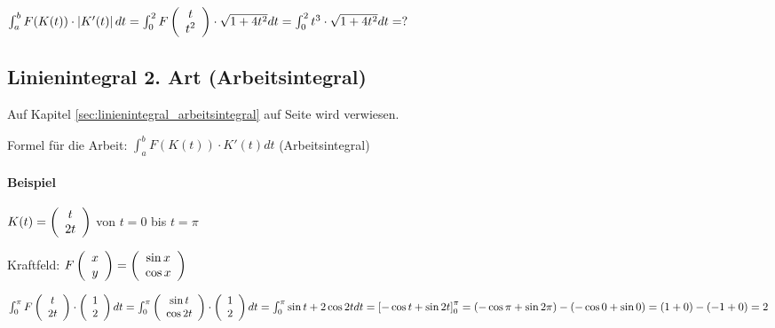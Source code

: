 $ \int_{a}^{b} F(K(t)) \cdot  \left\vert K'(t) \right\vert  dt 
= \int_0^2 F  \left(  \begin{array}{c} t\\t^2 \end{array}  \right)   \cdot \sqrt{1 + 4t^2} dt
= \int_{0}^{2} t^3 \cdot \sqrt{1 + 4t^2} dt
= ?
$

\subsection{Linienintegral 2. Art (Arbeitsintegral)}
Auf Kapitel \ref{sec:linienintegral_arbeitsintegral} auf Seite \pageref{sec:linienintegral_arbeitsintegral} wird verwiesen. 

Formel für die Arbeit: $\int_{a}^{b} F(K(t)) \cdot K'(t) dt$ (Arbeitsintegral) 

\paragraph{Beispiel}
$ K(t) =   \left(  \begin{array}{c} t\\2t \end{array}  \right)  $ von $t=0$ bis $t=\pi$

Kraftfeld: $F  \left(  \begin{array}{c} x\\y \end{array}  \right)   =   \left(  \begin{array}{c} \sin x\\\cos x \end{array}  \right)  $

$ \int_{0}^{\pi} F  \left(  \begin{array}{c} t\\2t \end{array}  \right)   \cdot   \left(  \begin{array}{c} 1\\2 \end{array}  \right)   dt
=\int_{0}^{\pi}   \left(  \begin{array}{c} \sin t\\\cos 2t \end{array}  \right)   \cdot   \left(  \begin{array}{c} 1\\2 \end{array}  \right)   dt
=\int_{0}^{\pi} \sin t + 2\cos 2t dt 
=  \left[ -\cos t + \sin 2t \right] _{0}^{\pi}
= (-\cos \pi + \sin 2\pi) - (-\cos 0 + \sin 0)
= (1+0)-(-1+0)
= 2 
$ 
